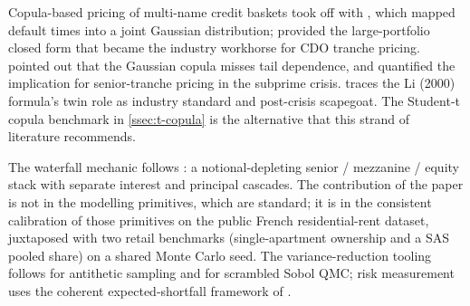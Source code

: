 Copula-based pricing of multi-name credit baskets took off with
\autocite{Li2000}, which mapped default times into a joint Gaussian
distribution; \autocite{Vasicek2002} provided the large-portfolio
closed form that became the industry workhorse for CDO tranche pricing.
\autocite{EmbrechtsMcNeilStraumann2002} pointed out that the Gaussian
copula misses tail dependence, and \autocite{DonnellyEmbrechts2010}
quantified the implication for senior-tranche pricing in the subprime
crisis. \autocite{MacKenzieSpears2014} traces the Li (2000) formula's
twin role as industry standard and post-crisis scapegoat. The
Student-t copula benchmark in \cref{ssec:t-copula} is the alternative
that this strand of literature recommends.

The waterfall mechanic follows \autocite{AndersenSideniusBasu2003}: a
notional-depleting senior / mezzanine / equity stack with separate
interest and principal cascades. The contribution of the paper is not
in the modelling primitives, which are standard; it is in the
consistent calibration of those primitives on the public French
residential-rent dataset, juxtaposed with two retail benchmarks
(single-apartment ownership and a SAS pooled share) on a shared Monte
Carlo seed. The variance-reduction tooling follows
\autocite{Glasserman2003} for antithetic sampling and
\autocite{Owen1997} for scrambled Sobol QMC; risk measurement uses the
coherent expected-shortfall framework of \autocite{AcerbiTasche2002}.
